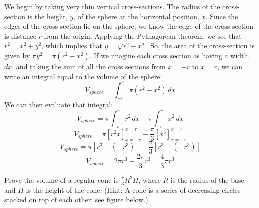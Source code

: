 We begin by taking very thin vertical cross-sections. The radius of the 
cross-section is the height, $y$, of the sphere at the horizontal position, 
$x$. Since the edges of the cross-section lie on the sphere, we know the edge 
of the cross-section is distance $r$ from the origin. Applying the Pythagorean 
theorem, we see that $r^2 = x^2 + y^2$, which implies that $y = \sqrt{r^2 - x^2
}$. So, the area of the cross-section is given by $\pi y^2 = \pi (r^2 - x^
2)$. If we imagine each cross section as having a width, $dx$, and taking the 
sum of all the cross sections from $x = -r$ to $x = r$, we can write an 
integral equal to the volume of the sphere:
$$V_{sphere} = \int_{-r}^{r} \pi (r^2 - x^2)\,dx$$
We can then evaluate that integral:
$$V_{sphere} = \pi \int_{-r}^{r} r^2\,dx - \pi \int_{-r}^{r} x^2\,dx$$
$$V_{sphere} = \pi \left[ r^2 x \right] _{x = -r}^{x = r} - \frac{\pi}{3} \left[
x^3 \right] _{x = -r}^{x = r} $$
$$V_{sphere} = \pi \left[ r^3 - (-r^3) \right] - \frac{\pi}{3} \left[r^3 - (-r^
3) \right]$$
$$V_{sphere} = 2 \pi r^3 - \frac{2\pi}{3} r^3 = \frac{4}{3}\pi r^3$$

\begin{Exercise}[label = volume3]
Prove the volume of a regular cone is $\frac{\pi}{3}R^2H$, where $R$ is the 
radius of the base and $H$ is the height of the cone. (Hint: A cone is a series
of decreasing circles stacked on top of each other; see figure below.)

\begin{center}
\end{center}
\end{Exercise}


